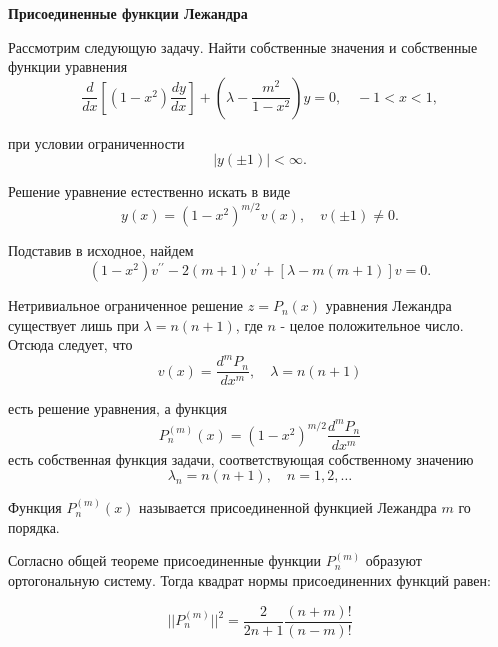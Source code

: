 \textbf{Присоединенные функции Лежандра}

Рассмотрим следующую задачу. Найти собственные значения и собственные функции уравнения
\[
\frac{d}{d x}\left[\left(1-x^{2}\right) \frac{d y}{d x}\right]+\left(\lambda-\frac{m^{2}}{1-x^{2}}\right) y=0, \quad-1<x<1,
\]

при условии ограниченности
\[
|y( \pm 1)|<\infty .
\]

Решение уравнение естественно искать в виде
\[
y(x)=\left(1-x^{2}\right)^{m / 2} v(x), \quad v( \pm 1) \neq 0 .
\]

Подставив в исходное, найдем
\[
\left(1-x^{2}\right) v^{\prime \prime}-2(m+1) v^{\prime}+[\lambda-m(m+1)] v=0 .
\]

Нетривиальное ограниченное решение $z=P_{n}(x)$ уравнения Лежандра существует лишь при $\lambda=n(n+1)$, где $n$ - целое положительное число. Отсюда следует, что
\[
v(x)=\frac{d^{m} P_{n}}{d x^{m}}, \quad \lambda=n(n+1)
\]

есть решение уравнения, а функция
\[
P_{n}^{(m)}(x)=\left(1-x^{2}\right)^{m / 2} \frac{d^{m} P_{n}}{d x^{m}}
\]
есть собственная функция задачи, соответствующая собственному значению
\[
\lambda_{n}=n(n+1), \quad n=1,2, \ldots
\]

Функция $P_{n}^{(m)}(x)$ называется присоединенной функцией Лежандра $m$ го порядка.

Согласно общей теореме присоединенные функции $P^{(m)}_n$ образуют ортогональную систему. Тогда квадрат нормы присоединенних функций равен:

\[
||P^{(m)}_n||^2 = \frac{2}{2n+1}\frac{(n+m)!}{(n-m)!}
\]


